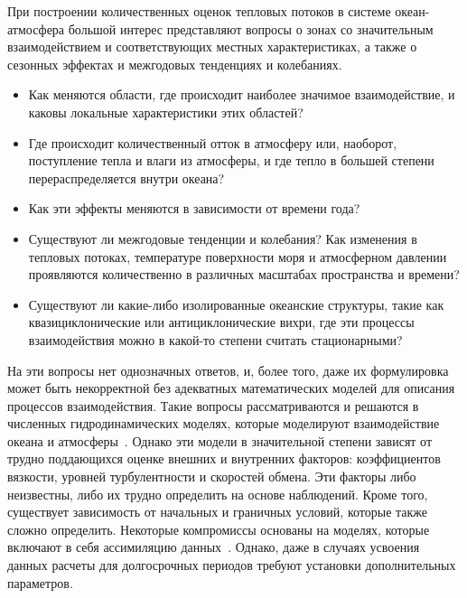 При построении количественных оценок тепловых потоков в системе океан-атмосфера большой интерес представляют вопросы о зонах со значительным взаимодействием и соответствующих местных характеристиках, а также о сезонных эффектах и межгодовых тенденциях и колебаниях.
\begin{itemize}
	\item Как меняются области, где происходит наиболее значимое взаимодействие, и каковы локальные характеристики этих областей?
	\item Где происходит количественный отток в атмосферу или, наоборот, поступление тепла и влаги из атмосферы, и где тепло в большей степени перераспределяется внутри океана?
	\item Как эти эффекты меняются в зависимости от времени года?
	\item Существуют ли межгодовые тенденции и колебания? Как изменения в тепловых потоках, температуре поверхности моря и атмосферном давлении проявляются количественно в различных масштабах пространства и времени?
	\item Существуют ли какие-либо изолированные океанские структуры, такие как квазициклонические или антициклонические вихри, где эти процессы взаимодействия можно в какой-то степени считать стационарными?
\end{itemize}
На эти вопросы нет однозначных ответов, и, более того, даже их формулировка может быть некорректной без адекватных математических моделей для описания процессов взаимодействия.
Такие вопросы рассматриваются и решаются в численных гидродинамических моделях, которые моделируют взаимодействие океана и атмосферы~\cite{gulev2012probability}.
Однако эти модели в значительной степени зависят от трудно поддающихся оценке внешних и внутренних факторов: коэффициентов вязкости, уровней турбулентности и скоростей обмена. Эти факторы либо неизвестны, либо их трудно определить на основе наблюдений. Кроме того, существует зависимость от начальных и граничных условий, которые также сложно определить. Некоторые компромиссы основаны на моделях, которые включают в себя ассимиляцию данных~\cite{FAO}. Однако, даже в случаях усвоения данных расчеты для долгосрочных периодов требуют установки дополнительных параметров.




